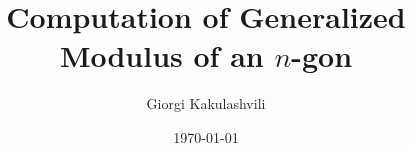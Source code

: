 \documentclass[12pt]{article}
\newcommand{\slidetitle}[1]{\section*{#1}}
\newenvironment{slide}{\newpage}
\begin{document}
\title{\Large\color{primary} Computation of Generalized Modulus of an $n$-gon}
\author{Giorgi Kakulashvili}
\date{\today}
\maketitle



\begin{slide}
    \slidetitle{Sample frame tilte}

    This is intersting

\end{slide}


\begin{slide}
    \slidetitle{This is other}
    This second slide
\end{slide}

\begin{slide}
    This third slide
\end{slide}
\end{document}
